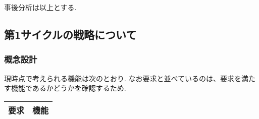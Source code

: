 事後分析は以上とする.


\subsection{第1サイクルの戦略について}

\subsubsection{概念設計}

現時点で考えられる機能は次のとおり. なお要求と並べているのは、要求を満たす機能であるかどうかを確認するため.

\begin{table}[htbp]
  \centering
  \begin{tabular}{|l|l|}
  \hline
    要求 & 機能 \\
  \hline


\end{tabular}
\end{table}
